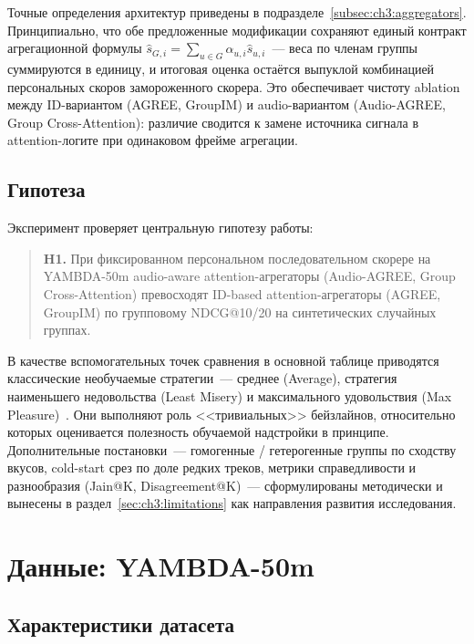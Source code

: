 Точные определения архитектур приведены в подразделе~\ref{subsec:ch3:aggregators}. Принципиально, что обе предложенные модификации сохраняют единый контракт агрегационной формулы $\hat{s}_{G, i} = \sum_{u \in G} \alpha_{u, i} \hat{s}_{u, i}$~--- веса по членам группы суммируются в единицу, и итоговая оценка остаётся выпуклой комбинацией персональных скоров замороженного скорера. Это обеспечивает чистоту ablation между ID-вариантом (AGREE, GroupIM) и audio-вариантом (Audio-AGREE, Group Cross-Attention): различие сводится к замене источника сигнала в attention-логите при одинаковом фрейме агрегации.

\subsection{Гипотеза}\label{subsec:ch3:hypothesis}

Эксперимент проверяет центральную гипотезу работы:

\begin{quote}
\textbf{H1.} При фиксированном персональном последовательном скорере на YAMBDA-50m audio-aware attention-агрегаторы (Audio-AGREE, Group Cross-Attention) превосходят ID-based attention-агрегаторы (AGREE, GroupIM) по групповому NDCG@10/20 на синтетических случайных группах.
\end{quote}

В качестве вспомогательных точек сравнения в основной таблице приводятся классические необучаемые стратегии~--- среднее (Average), стратегия наименьшего недовольства (Least Misery) и максимального удовольствия (Max Pleasure)~\cite{cao2018agree}. Они выполняют роль <<тривиальных>> бейзлайнов, относительно которых оценивается полезность обучаемой надстройки в принципе. Дополнительные постановки~--- гомогенные / гетерогенные группы по сходству вкусов, cold-start срез по доле редких треков, метрики справедливости и разнообразия (Jain@K, Disagreement@K)~--- сформулированы методически и вынесены в раздел~\ref{sec:ch3:limitations} как направления развития исследования.

\section{Данные: YAMBDA-50m}\label{sec:ch3:data}

\subsection{Характеристики датасета}\label{subsec:ch3:data-overview}

